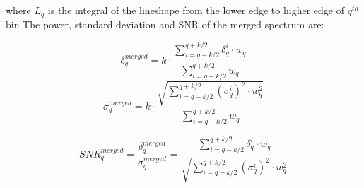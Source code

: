 where $L_q$ is the integral of the lineshape from the lower edge to higher edge of ${q^{th}}$ bin
The power, standard deviation and SNR of the merged spectrum are:


\begin{equation}
    \label{eq:merged_power}
    \delta_{q}^{merged} = k \cdot \frac{ \sum_{i = q-k/2}^{q+k/2}\delta_{q}^{i} \cdot {w_{q}}}{\sum_{i = q-k/2}^{q+k/2} {w_{q}}}
\end{equation}
\begin{equation}
    \label{eq:merged_sigma}
    \sigma_{q}^{merged} = k \cdot \frac{ \sqrt{\sum_{i = q-k/2}^{q+k/2} (\sigma_{q}^{i})^2 \cdot {w_{q}^2}}}{\sum_{i = q-k/2}^{q+k/2} {w_{q}}}
\end{equation}

\begin{equation}
    \label{eq:merged_snr}
    {SNR}_{q}^{merged} = \frac{\delta^{merged}_{q}}{\sigma^{merged}_{q}} = \frac{\sum_{i = q-k/2}^{q+k/2}\delta_{q}^{i} \cdot {w_{q}}}{ \sqrt{\sum_{i = q-k/2}^{q+k/2} (\sigma_{q}^{i})^2 \cdot {w_{q}^2}}}
\end{equation}


